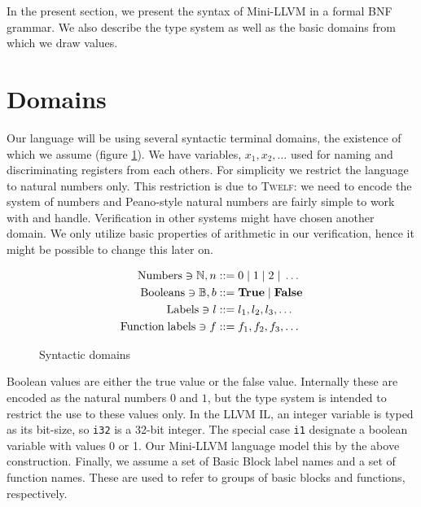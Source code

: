 \documentclass[a4paper, oneside, 10pt, draft]{memoir}
\newcommand{\twelf}{\textsc{Twelf}}
\begin{document}
In the present section, we present the syntax of Mini-LLVM in a formal BNF
grammar. We also describe the type system as well as the basic domains
from which we draw values.

\section{Domains}


\newcommand{\numbers}{\mathrm{Numbers}}
\newcommand{\booleans}{\mathrm{Booleans}}
\newcommand{\funlabels}{\mathrm{Function\; labels}}
\newcommand{\nat}{n}
\newcommand{\bool}{b}
\newcommand{\BB}{\mathbb{B}}
\newcommand{\btrue}{\mathbf{True}}
\newcommand{\bfalse}{\mathbf{False}}
\newcommand{\dbundle}{(d_1, d_2, \dotsc, d_m)}
\newcommand{\sbundle}{(\sigma_1, \sigma_2, \dotsc, \sigma_m)}
\newcommand{\bbtypes}{\sbundle}

Our language will be using several syntactic terminal domains, the
existence of which we assume (figure \ref{fig:syntactic-domains}). We
have variables, $x_1, x_2, \dotsc$ used for naming and discriminating
registers from each others. For simplicity we restrict the language to
natural numbers only. This restriction is due to \twelf{}: we need to
encode the system of numbers and Peano-style natural numbers are
fairly simple to work with and handle. Verification in other systems
might have chosen another domain. We only utilize basic properties of
arithmetic in our verification, hence it might be possible to change
this later on.
\begin{figure}
  \begin{align*}
    \numbers \ni \NN, \nat & ::= 0 \bor 1 \bor 2 \bor \dotsc\\
    \booleans \ni \BB, \bool & ::= \btrue \bor \bfalse \\
    \BBlabels \ni l & ::= l_1, l_2, l_3, \dotsc \\
    \funlabels \ni f & ::= f_1,f_2,f_3,\dotsc
  \end{align*}
  \caption{Syntactic domains}
  \label{fig:syntactic-domains}
\end{figure}

Boolean values are either the true value or the false
value. Internally these are encoded as the natural numbers $0$ and
$1$, but the type system is intended to restrict the use to these
values only. In the LLVM IL, an integer variable is typed as its
bit-size, so \texttt{i32} is a 32-bit integer. The special case
\texttt{i1} designate a boolean variable with values 0 or 1. Our
Mini-LLVM language model this by the above construction. Finally, we
assume a set of Basic Block label names and a set of function
names. These are used to refer to groups of basic blocks and
functions, respectively.
\end{document}
